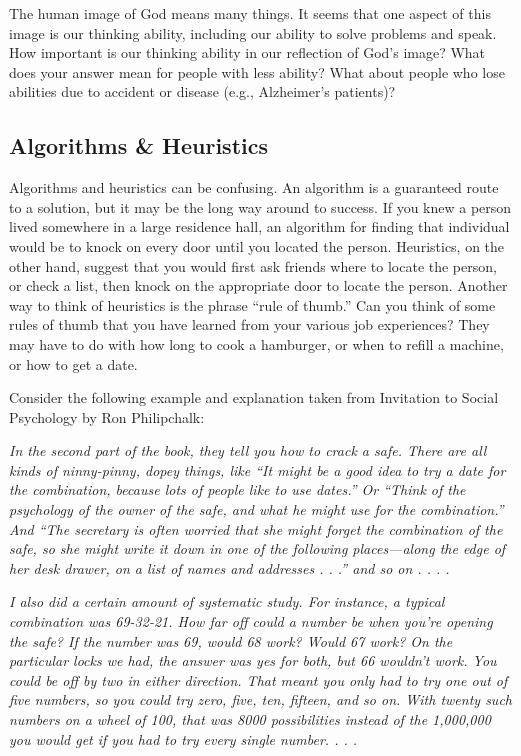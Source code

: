 \documentclass[
]{book}
\begin{document}
The human image of God means many things. It seems that one aspect of this image is our thinking ability, including our ability to solve problems and speak. How important is our thinking ability in our reflection of God's image? What does your answer mean for people with less ability? What about people who lose abilities due to accident or disease (e.g., Alzheimer's patients)?

\hypertarget{algorithms-heuristics}{%
\subsection*{Algorithms \& Heuristics}\label{algorithms-heuristics}}

Algorithms and heuristics can be confusing. An algorithm is a guaranteed route to a solution, but it may be the long way around to success. If you knew a person lived somewhere in a large residence hall, an algorithm for finding that individual would be to knock on every door until you located the person. Heuristics, on the other hand, sug­gest that you would first ask friends where to locate the person, or check a list, then knock on the appropriate door to locate the person. Another way to think of heuristics is the phrase ``rule of thumb.'' Can you think of some rules of thumb that you have learned from your various job experiences? They may have to do with how long to cook a hamburger, or when to refill a machine, or how to get a date.

Consider the following example and explanation taken from Invitation to Social Psychology by Ron Philipchalk:

\emph{In the second part of the book, they tell you how to crack a safe. There are all kinds of ninny-pinny, dopey things, like ``It might be a good idea to try a date for the combination, because lots of people like to use dates.'' Or ``Think of the psychology of the owner of the safe, and what he might use for the combination.'' And ``The secretary is often worried that she might forget the combination of the safe, so she might write it down in one of the following places---along the edge of her desk drawer, on a list of names and addresses . . .'' and so on . . . .}

\emph{I also did a certain amount of systematic study. For instance, a typical combination was 69-32-21. How far off could a number be when you're opening the safe? If the number was 69, would 68 work? Would 67 work? On the particular locks we had, the answer was yes for both, but 66 wouldn't work. You could be off by two in either direction. That meant you only had to try one out of five numbers, so you could try zero, five, ten, fifteen, and so on. With twenty such numbers on a wheel of 100, that was 8000 possibilities instead of the 1,000,000 you would get if you had to try every single number. . . .}
\end{document}
